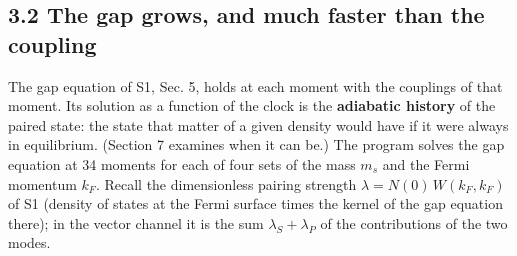 \documentclass[
  10pt,
]{article}
\begin{document}
\hypertarget{the-gap-grows-and-much-faster-than-the-coupling}{%
\subsection{3.2 The gap grows, and much faster than the
coupling}\label{the-gap-grows-and-much-faster-than-the-coupling}}

The gap equation of S1, Sec. 5, holds at each moment with the couplings
of that moment. Its solution as a function of the clock is the
\textbf{adiabatic history} of the paired state: the state that matter of
a given density would have if it were always in equilibrium. (Section 7
examines when it can be.) The program solves the gap equation at 34
moments for each of four sets of the mass \(m_s\) and the Fermi momentum
\(k_F\). Recall the dimensionless pairing strength
\(\lambda=N(0)\,W(k_F,k_F)\) of S1 (density of states at the Fermi
surface times the kernel of the gap equation there); in the vector
channel it is the sum \(\lambda_S+\lambda_P\) of the contributions of
the two modes.
\end{document}
